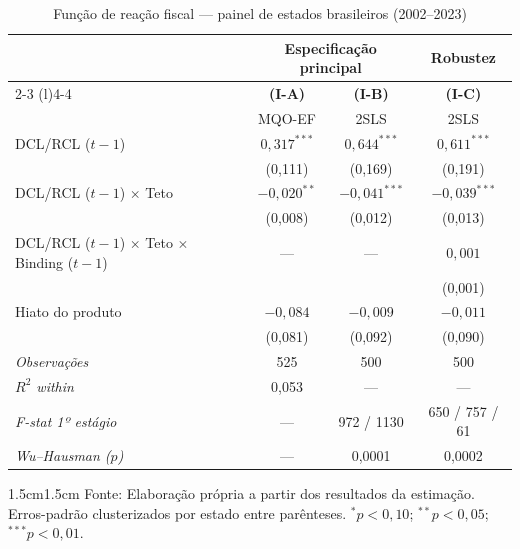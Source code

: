 \vspace{14pt}

\begin{table}[H]
\centering
\caption{Função de reação fiscal --- painel de estados brasileiros (2002--2023)}
\label{tab:resultados}
\footnotesize
\renewcommand{\arraystretch}{1.0}
\setlength{\tabcolsep}{4pt}
\begin{tabular}{lccc}
\toprule
 & \multicolumn{2}{c}{Especificação principal} & Robustez \\
\cmidrule(l){2-3} \cmidrule(l){4-4}
 & \textbf{(I-A)} & \textbf{(I-B)} & \textbf{(I-C)} \\
 & MQO-EF & 2SLS & 2SLS \\
\midrule
DCL/RCL ($t-1$) & $0,317^{***}$ & $0,644^{***}$ & $0,611^{***}$ \\
\color{gray!75} & \color{gray!75}(0,111) & \color{gray!75}(0,169) & \color{gray!75}(0,191) \\[3pt]
DCL/RCL ($t-1$) $\times$ Teto & $-0,020^{**}$ & $-0,041^{***}$ & $-0,039^{***}$ \\
\color{gray!75} & \color{gray!75}(0,008) & \color{gray!75}(0,012) & \color{gray!75}(0,013) \\[3pt]
DCL/RCL ($t-1$) $\times$ Teto $\times$ Binding ($t-1$) & --- & --- & $0,001$ \\
\color{gray!75} & & & \color{gray!75}(0,001) \\[3pt]
Hiato do produto & $-0,084$ & $-0,009$ & $-0,011$ \\
\color{gray!75} & \color{gray!75}(0,081) & \color{gray!75}(0,092) & \color{gray!75}(0,090) \\
\midrule
\textcolor{gray!70}{\textit{Observações}} & 525 & 500 & 500 \\
\textcolor{gray!70}{\textit{$R^2$ within}} & 0,053 & --- & --- \\
\textcolor{gray!70}{\textit{F-stat 1º estágio}} & --- & 972 / 1130 & 650 / 757 / 61 \\
\textcolor{gray!70}{\textit{Wu--Hausman ($p$)}} & --- & 0,0001 & 0,0002 \\
\bottomrule
\end{tabular}

\vspace{6pt}
\begin{adjustwidth}{1.5cm}{1.5cm}
\footnotesize
\noindent
Fonte: Elaboração própria a partir dos resultados da estimação. Erros-padrão clusterizados por estado entre parênteses. $^{*}p < 0{,}10$; $^{**}p < 0{,}05$; $^{***}p < 0{,}01$.
\end{adjustwidth}

\end{table}

\vspace{14pt}